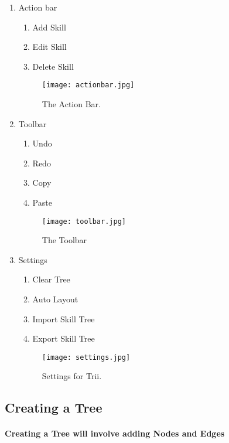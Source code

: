 \documentclass[12pt]{article}
\begin{document}
\begin{enumerate}
	\item Action bar
	\begin{enumerate}
    	\item Add Skill
      	\item Edit Skill
      	\item Delete Skill
 	\end{enumerate}
  
  \begin{figure}
    \texttt{[image: actionbar.jpg]}
    \caption{The Action Bar.}
    \label{fig:actionbar}
  \end{figure}

  
  \item Toolbar
  \begin{enumerate}
    	\item Undo
      \item Redo
      \item Copy
      \item Paste
  \end{enumerate}
  
  \begin{figure}
    \texttt{[image: toolbar.jpg]}
    \caption{The Toolbar}
    \label{fig:toolbar}
  \end{figure}
  
  \item Settings
  \begin{enumerate}
    	\item Clear Tree
      \item Auto Layout
      \item Import Skill Tree
      \item Export Skill Tree
  \end{enumerate}
  
  \begin{figure}
    \texttt{[image: settings.jpg]}
    \caption{Settings for Trii.}
    \label{fig:settings}
  \end{figure}
  
\end{enumerate}

\newpage
\subsection{Creating a Tree}
\paragraph{Creating a Tree will involve adding Nodes and Edges}
\end{document}
